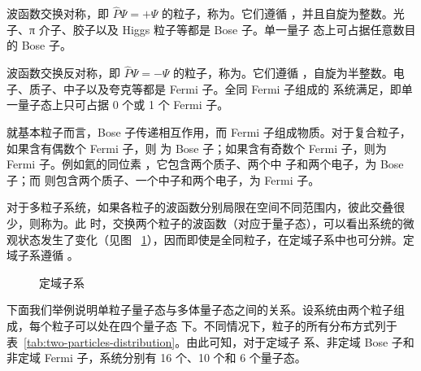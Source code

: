 波函数交换对称，即 $\hat{P}\Psi=+\Psi$ 的粒子，称为。它们遵循%
，并且自旋为整数。光子、π 介子、胶子以及 Higgs 粒子等都是 Bose 子。单一量子
态上可占据任意数目的 Bose 子。

波函数交换反对称，即 $\hat{P}\Psi=-\Psi$ 的粒子，称为。它们遵循%
，自旋为半整数。电子、质子、中子以及夸克等都是 Fermi 子。全同 Fermi 子组成的
系统满足，即单一量子态上只可占据 0 个或 1 个 Fermi 子。

就基本粒子而言，Bose 子传递相互作用，而 Fermi 子组成物质。对于复合粒子，如果含有偶数个 Fermi 子，则
为 Bose 子；如果含有奇数个 Fermi 子，则为 Fermi 子。例如氦的同位素 ，它包含两个质子、两个中
子和两个电子，为 Bose 子；而  则包含两个质子、一个中子和两个电子，为 Fermi 子。

对于多粒子系统，如果各粒子的波函数分别局限在空间不同范围内，彼此交叠很少，则称为。此
时，交换两个粒子的波函数（对应于量子态），可以看出系统的微观状态发生了变化（见图~%
\ref{fig:localized-sub-system}），因而即使是全同粒子，在定域子系中也可分辨。定域子系遵循%
。

\begin{figure}[ht]
  \centering
  \FIGPLACEHOLDER
  \caption{定域子系}
  \label{fig:localized-sub-system}
\end{figure}

下面我们举例说明单粒子量子态与多体量子态之间的关系。设系统由两个粒子组成，每个粒子可以处在四个量子态
下。不同情况下，粒子的所有分布方式列于表~\ref{tab:two-particles-distribution}。由此可知，对于定域子
系、非定域 Bose 子和非定域 Fermi 子，系统分别有 16 个、10 个和 6 个量子态。

